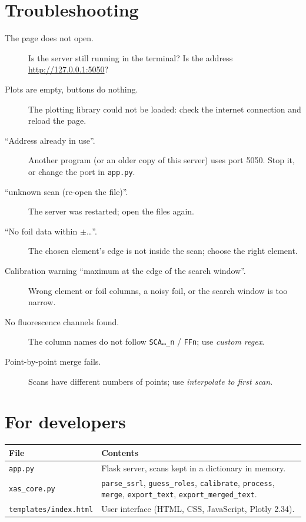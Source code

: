 \documentclass[11pt,a4paper]{article}
\newcommand{\file}[1]{\texttt{#1}}
\newcommand{\col}[1]{\texttt{#1}}                  %
\begin{document}
\section{Troubleshooting}
\begin{description}
  \item[The page does not open.] Is the server still running in the terminal? Is the address
        \url{http://127.0.0.1:5050}?
  \item[Plots are empty, buttons do nothing.] The plotting library could not be loaded: check the internet
        connection and reload the page.
  \item[``Address already in use''.] Another program (or an older copy of this server) uses port 5050.
        Stop it, or change the port in \file{app.py}.
  \item[``unknown scan (re-open the file)''.] The server was restarted; open the files again.
  \item[``No foil data within $\pm$\ldots''.] The chosen element's edge is not inside the scan; choose the
        right element.
  \item[Calibration warning ``maximum at the edge of the search window''.] Wrong element or foil columns,
        a noisy foil, or the search window is too narrow.
  \item[No fluorescence channels found.] The column names do not follow \col{SCA\ldots\_n} / \col{FFn};
        use \emph{custom regex}.
  \item[Point-by-point merge fails.] Scans have different numbers of points; use
        \emph{interpolate to first scan}.
\end{description}

\section{For developers}
\begin{center}
\begin{tabularx}{\linewidth}{@{}lX@{}}
\toprule
File & Contents\\
\midrule
\file{app.py}               & Flask server, scans kept in a dictionary in memory.\\
\file{xas\_core.py}         & \texttt{parse\_ssrl}, \texttt{guess\_roles}, \texttt{calibrate}, \texttt{process},
                              \texttt{merge}, \texttt{export\_text}, \texttt{export\_merged\_text}.\\
\file{templates/index.html} & User interface (HTML, CSS, JavaScript, Plotly 2.34).\\
\bottomrule
\end{tabularx}
\end{center}
\end{document}
